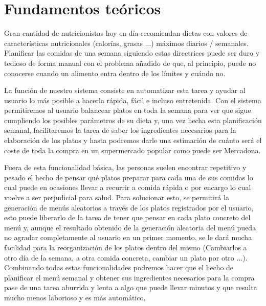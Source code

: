 \documentclass[12pt, a4paper, twoside]{book}
\begin{document}
	\chapter{Fundamentos teóricos}
	Gran cantidad de nutricionistas hoy en día recomiendan dietas con valores de características nutricionales (calorías, grasas ...) máximos diarios / semanales.
	Planificar las comidas de una semana siguiendo estas directrices puede ser duro y tedioso de forma manual con el problema añadido de que, al principio, puede no conocerse cuando un alimento entra dentro de los límites y cuándo no.
	
	La función de nuestro sistema consiste en automatizar esta tarea y ayudar al usuario lo más posible a hacerla rápida, fácil e incluso entretenida. Con el sistema permitiremos al usuario balancear platos en toda la semana para ver que sigue cumpliendo los posibles parámetros de su dieta y, una vez hecha esta planificación semanal, facilitaremos la tarea de saber los ingredientes necesarios para la elaboración de los platos y hasta podremos darle una estimación de cuánto será el coste de toda la compra en un supermercado popular como puede ser Mercadona.
	
	Fuera de esta funcionalidad básica, las personas suelen encontrar repetitivo y pesado el hecho de pensar qué platos preparar para cada una de sus comidas lo cual puede en ocasiones llevar a recurrir a comida rápida o por encargo lo cual vuelve a ser perjudicial para salud. Para solucionar esto, se permitirá la generación de menús aleatorios a través de los platos registrados por el usuario, esto puede liberarlo de la tarea de tener que pensar en cada plato concreto del menú y, aunque el resultado obtenido de la generación aleatoria del menú pueda no agradar completamente al usuario en un primer momento, se le dará mucha facilidad para la reorganización de los platos dentro del mismo (Cambiarlos a otro día de la semana, a otra comida concreta, cambiar un plato por otro ...).\\
	Combinando todas estas funcionalidades podremos hacer que el hecho de planificar el menú semanal y obtener sus ingredientes necesarios para la compra pase de una tarea aburrida y lenta a algo que puede llevar minutos y que resulta mucho menos laborioso y es más automático.
	
\end{document}
